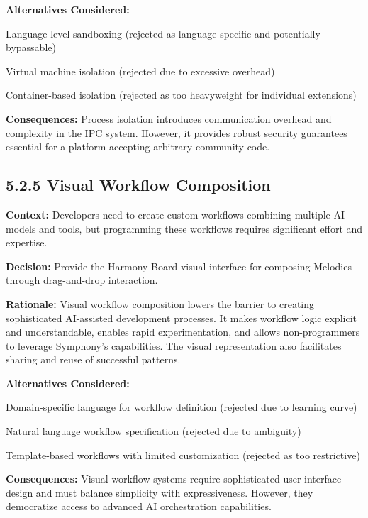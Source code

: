 \textbf{Alternatives Considered:}
\begin{compactlist}
    \item Language-level sandboxing (rejected as language-specific and potentially bypassable)
    \item Virtual machine isolation (rejected due to excessive overhead)
    \item Container-based isolation (rejected as too heavyweight for individual extensions)
\end{compactlist}

\textbf{Consequences:} Process isolation introduces communication overhead and complexity in the IPC system. However, it provides robust security guarantees essential for a platform accepting arbitrary community code.

\subsection*{5.2.5 Visual Workflow Composition}

\textbf{Context:} Developers need to create custom workflows combining multiple AI models and tools, but programming these workflows requires significant effort and expertise.

\textbf{Decision:} Provide the Harmony Board visual interface for composing Melodies through drag-and-drop interaction.

\textbf{Rationale:} Visual workflow composition lowers the barrier to creating sophisticated AI-assisted development processes. It makes workflow logic explicit and understandable, enables rapid experimentation, and allows non-programmers to leverage Symphony's capabilities. The visual representation also facilitates sharing and reuse of successful patterns.

\textbf{Alternatives Considered:}
\begin{compactlist}
    \item Domain-specific language for workflow definition (rejected due to learning curve)
    \item Natural language workflow specification (rejected due to ambiguity)
    \item Template-based workflows with limited customization (rejected as too restrictive)
\end{compactlist}

\textbf{Consequences:} Visual workflow systems require sophisticated user interface design and must balance simplicity with expressiveness. However, they democratize access to advanced AI orchestration capabilities.

